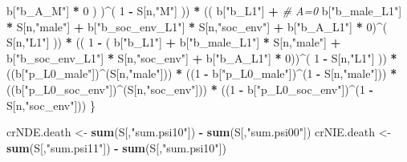 \documentclass[
]{book}
\newenvironment{Shaded}{\begin{snugshade}}{\end{snugshade}}
\newcommand{\CommentTok}[1]{\textcolor[rgb]{0.56,0.35,0.01}{\textit{#1}}}
\newcommand{\DecValTok}[1]{\textcolor[rgb]{0.00,0.00,0.81}{#1}}
\newcommand{\FunctionTok}[1]{\textcolor[rgb]{0.13,0.29,0.53}{\textbf{#1}}}
\newcommand{\NormalTok}[1]{#1}
\newcommand{\OtherTok}[1]{\textcolor[rgb]{0.56,0.35,0.01}{#1}}
\newcommand{\SpecialCharTok}[1]{\textcolor[rgb]{0.81,0.36,0.00}{\textbf{#1}}}
\newcommand{\StringTok}[1]{\textcolor[rgb]{0.31,0.60,0.02}{#1}}
\begin{document}
\begin{Shaded}
\begin{Highlighting}[]
\NormalTok{                b[}\StringTok{"b\_A\_M"}\NormalTok{] }\SpecialCharTok{*} \DecValTok{0}\NormalTok{ ) )}\SpecialCharTok{\^{}}\NormalTok{( }\DecValTok{1} \SpecialCharTok{{-}}\NormalTok{ S[n,}\StringTok{"M"}\NormalTok{] )) }\SpecialCharTok{*}
\NormalTok{      (( b[}\StringTok{"b\_L1"}\NormalTok{] }\SpecialCharTok{+}                                                            \CommentTok{\# A=0}
\NormalTok{           b[}\StringTok{"b\_male\_L1"}\NormalTok{] }\SpecialCharTok{*}\NormalTok{ S[n,}\StringTok{"male"}\NormalTok{] }\SpecialCharTok{+}  
\NormalTok{           b[}\StringTok{"b\_soc\_env\_L1"}\NormalTok{] }\SpecialCharTok{*}\NormalTok{ S[n,}\StringTok{"soc\_env"}\NormalTok{] }\SpecialCharTok{+}
\NormalTok{           b[}\StringTok{"b\_A\_L1"}\NormalTok{] }\SpecialCharTok{*} \DecValTok{0}\NormalTok{)}\SpecialCharTok{\^{}}\NormalTok{( S[n,}\StringTok{"L1"}\NormalTok{] )) }\SpecialCharTok{*}
\NormalTok{      (( }\DecValTok{1} \SpecialCharTok{{-}}\NormalTok{ ( b[}\StringTok{"b\_L1"}\NormalTok{] }\SpecialCharTok{+}
\NormalTok{                 b[}\StringTok{"b\_male\_L1"}\NormalTok{] }\SpecialCharTok{*}\NormalTok{ S[n,}\StringTok{"male"}\NormalTok{] }\SpecialCharTok{+}  
\NormalTok{                 b[}\StringTok{"b\_soc\_env\_L1"}\NormalTok{] }\SpecialCharTok{*}\NormalTok{ S[n,}\StringTok{"soc\_env"}\NormalTok{] }\SpecialCharTok{+}
\NormalTok{                 b[}\StringTok{"b\_A\_L1"}\NormalTok{] }\SpecialCharTok{*} \DecValTok{0}\NormalTok{))}\SpecialCharTok{\^{}}\NormalTok{( }\DecValTok{1} \SpecialCharTok{{-}}\NormalTok{ S[n,}\StringTok{"L1"}\NormalTok{] )) }\SpecialCharTok{*}
\NormalTok{      ((b[}\StringTok{"p\_L0\_male"}\NormalTok{])}\SpecialCharTok{\^{}}\NormalTok{(S[n,}\StringTok{"male"}\NormalTok{])) }\SpecialCharTok{*} 
\NormalTok{      ((}\DecValTok{1} \SpecialCharTok{{-}}\NormalTok{ b[}\StringTok{"p\_L0\_male"}\NormalTok{])}\SpecialCharTok{\^{}}\NormalTok{(}\DecValTok{1} \SpecialCharTok{{-}}\NormalTok{ S[n,}\StringTok{"male"}\NormalTok{])) }\SpecialCharTok{*} 
\NormalTok{      ((b[}\StringTok{"p\_L0\_soc\_env"}\NormalTok{])}\SpecialCharTok{\^{}}\NormalTok{(S[n,}\StringTok{"soc\_env"}\NormalTok{])) }\SpecialCharTok{*}
\NormalTok{      ((}\DecValTok{1} \SpecialCharTok{{-}}\NormalTok{ b[}\StringTok{"p\_L0\_soc\_env"}\NormalTok{])}\SpecialCharTok{\^{}}\NormalTok{(}\DecValTok{1} \SpecialCharTok{{-}}\NormalTok{ S[n,}\StringTok{"soc\_env"}\NormalTok{]))}
\NormalTok{    \}}
  
\NormalTok{  crNDE.death }\OtherTok{\textless{}{-}} \FunctionTok{sum}\NormalTok{(S[,}\StringTok{"sum.psi10"}\NormalTok{]) }\SpecialCharTok{{-}} \FunctionTok{sum}\NormalTok{(S[,}\StringTok{"sum.psi00"}\NormalTok{])}
\NormalTok{  crNIE.death }\OtherTok{\textless{}{-}} \FunctionTok{sum}\NormalTok{(S[,}\StringTok{"sum.psi11"}\NormalTok{]) }\SpecialCharTok{{-}} \FunctionTok{sum}\NormalTok{(S[,}\StringTok{"sum.psi10"}\NormalTok{])}
  

\end{Highlighting}
\end{Shaded}
\end{document}
